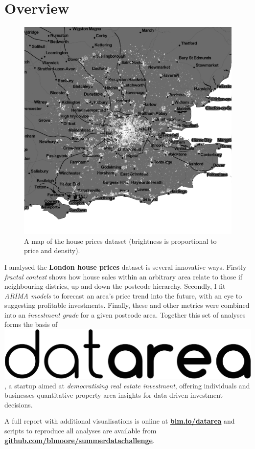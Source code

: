 \documentclass[
10pt, %
a4paper, %
oneside, %
headinclude,footinclude, %
BCOR5mm, %
]{scrartcl}
\newcommand*{\logo}{\includegraphics[scale=.04]{Figures/logotext.png}}
\begin{document}
\section*{Overview} 

\setlength{\intextsep}{0em}
\begin{figure}
\centering
\includegraphics[width=.28\textwidth]{Figures/overview.png}
\vspace{-1em}
\caption*{ A map of the house prices dataset (brightness is proportional to
  price and density).}
\end{figure}

I analysed the {\bf London house prices} dataset is several innovative
ways. Firstly \emph{fractal context} shows how house sales within an
arbitrary area relate to those if neighbouring districs, up and down
the postcode hierarchy. Secondly, I fit \emph{ARIMA models} to
forecast an area's price trend into the future, with an eye to
suggesting profitable investments. Finally, these and other metrics
were combined into an \emph{investment grade} for a given postcode
area. Together this set of analyses forms the basis of \logo, a
startup aimed at \emph{democratising real estate investment}, offering
individuals and businesses quantitative property area insights for
data-driven investment decisions.

A full report with additional visualisations is online at {\bf
  \leavevmode\href{http://blm.io/datarea}{blm.io/datarea} }and scripts to
reproduce all analyses are available from {\bf
  \leavevmode\href{http://github.com/blmoore/summerdatachallenge}{github.com/blmoore/summerdatachallenge}}.


{\let\thefootnote\relax{}}
\end{document}

